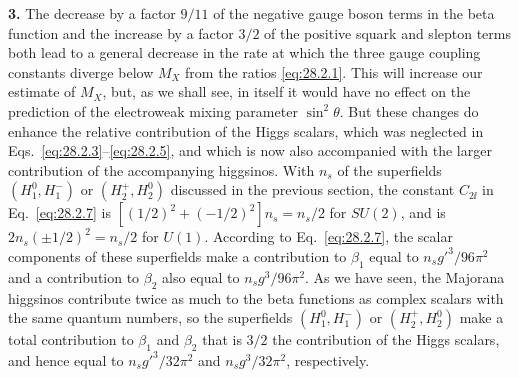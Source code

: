 \noindent\textbf{3.}\quad
The decrease by a factor \(9/11\) of the negative gauge boson terms in the
beta function and the increase by a factor \(3/2\) of the positive squark
and slepton terms both lead to a general decrease in the rate at which the
three gauge coupling constants diverge below \(M_X\) from the ratios
\eqref{eq:28.2.1}. This will increase our estimate of \(M_X\), but, as we
shall see, in itself it would have no effect on the prediction of the
electroweak mixing parameter \(\sin^2\theta\). But these changes do enhance
the relative contribution of the Higgs scalars, which was neglected in
Eqs.~\eqref{eq:28.2.3}--\eqref{eq:28.2.5}, and which is now also
accompanied with the larger contribution of the accompanying higgsinos.
With \(n_s\) of the superfields \((H_1^0,H_1^-)\) or
\((H_2^+,H_2^0)\) discussed in the previous section, the constant
\(C_{2\ii}\) in Eq.~\eqref{eq:28.2.7} is
\([(1/2)^2+(-1/2)^2]n_s=n_s/2\) for \(SU(2)\), and is
\(2n_s(\pm1/2)^2=n_s/2\) for \(U(1)\). According to
Eq.~\eqref{eq:28.2.7}, the scalar components of these superfields make a
contribution to \(\beta_1\) equal to \(n_sg'^3/96\pi^2\) and a contribution
to \(\beta_2\) also equal to \(n_sg^3/96\pi^2\). As we have seen, the
Majorana higgsinos contribute twice as much to the beta functions as
complex scalars with the same quantum numbers, so the superfields
\((H_1^0,H_1^-)\) or \((H_2^+,H_2^0)\) make a total contribution to
\(\beta_1\) and \(\beta_2\) that is \(3/2\) the contribution of the Higgs
scalars, and hence equal to \(n_sg'^3/32\pi^2\) and \(n_sg^3/32\pi^2\),
respectively.

